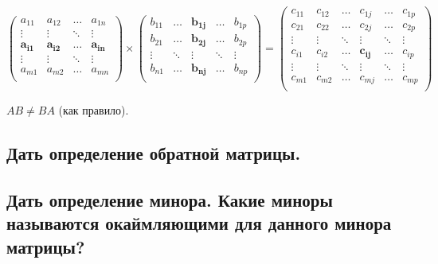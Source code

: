$$
\begin{pmatrix} 
    a_{11}&a_{12}&\ldots&a_{1n}\\ 
    \vdots&\vdots&\ddots&\vdots\\
    \mathbf{a_{i1}}&\mathbf{a_{i2}}&\mathbf{\ldots}&\mathbf{a_{in}}\\ 
    \vdots&\vdots&\ddots&\vdots\\
    a_{m1}&a_{m2}&\ldots&a_{mn}\\ 
\end{pmatrix}
\times
\begin{pmatrix} 
    b_{11}&\ldots&\mathbf{b_{1j}}&\ldots&b_{1p}\\ 
    b_{21}&\ldots&\mathbf{b_{2j}}&\ldots&b_{2p}\\ 
    \vdots&\ddots&\mathbf{\vdots}&\ddots&\vdots\\
    b_{n1}&\ldots&\mathbf{b_{nj}}&\ldots&b_{np}\\ 
\end{pmatrix}
=
\begin{pmatrix} 
    c_{11}&c_{12}&\ldots&c_{1j}&\ldots&c_{1p}\\ 
    c_{21}&c_{22}&\ldots&c_{2j}&\ldots&c_{2p}\\ 
    \vdots&\vdots&\ddots&\vdots&\ddots&\vdots\\
    c_{i1}&c_{i2}&\ldots&\mathbf{c_{ij}}&\ldots&c_{ip}\\ 
    \vdots&\vdots&\ddots&\vdots&\ddots&\vdots\\
    c_{m1}&c_{m2}&\ldots&c_{mj}&\ldots&c_{mp}\\ 
\end{pmatrix}
$$

$AB \ne BA$ (как правило).

\subsection{Дать определение обратной матрицы.}


\subsection{Дать определение минора. Какие миноры называются окаймляющими для данного минора матрицы?}

